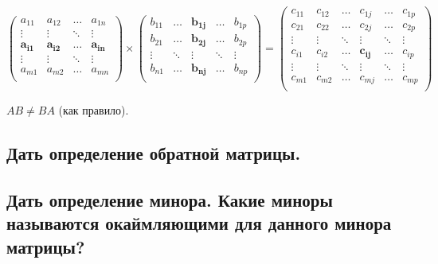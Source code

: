$$
\begin{pmatrix} 
    a_{11}&a_{12}&\ldots&a_{1n}\\ 
    \vdots&\vdots&\ddots&\vdots\\
    \mathbf{a_{i1}}&\mathbf{a_{i2}}&\mathbf{\ldots}&\mathbf{a_{in}}\\ 
    \vdots&\vdots&\ddots&\vdots\\
    a_{m1}&a_{m2}&\ldots&a_{mn}\\ 
\end{pmatrix}
\times
\begin{pmatrix} 
    b_{11}&\ldots&\mathbf{b_{1j}}&\ldots&b_{1p}\\ 
    b_{21}&\ldots&\mathbf{b_{2j}}&\ldots&b_{2p}\\ 
    \vdots&\ddots&\mathbf{\vdots}&\ddots&\vdots\\
    b_{n1}&\ldots&\mathbf{b_{nj}}&\ldots&b_{np}\\ 
\end{pmatrix}
=
\begin{pmatrix} 
    c_{11}&c_{12}&\ldots&c_{1j}&\ldots&c_{1p}\\ 
    c_{21}&c_{22}&\ldots&c_{2j}&\ldots&c_{2p}\\ 
    \vdots&\vdots&\ddots&\vdots&\ddots&\vdots\\
    c_{i1}&c_{i2}&\ldots&\mathbf{c_{ij}}&\ldots&c_{ip}\\ 
    \vdots&\vdots&\ddots&\vdots&\ddots&\vdots\\
    c_{m1}&c_{m2}&\ldots&c_{mj}&\ldots&c_{mp}\\ 
\end{pmatrix}
$$

$AB \ne BA$ (как правило).

\subsection{Дать определение обратной матрицы.}


\subsection{Дать определение минора. Какие миноры называются окаймляющими для данного минора матрицы?}

